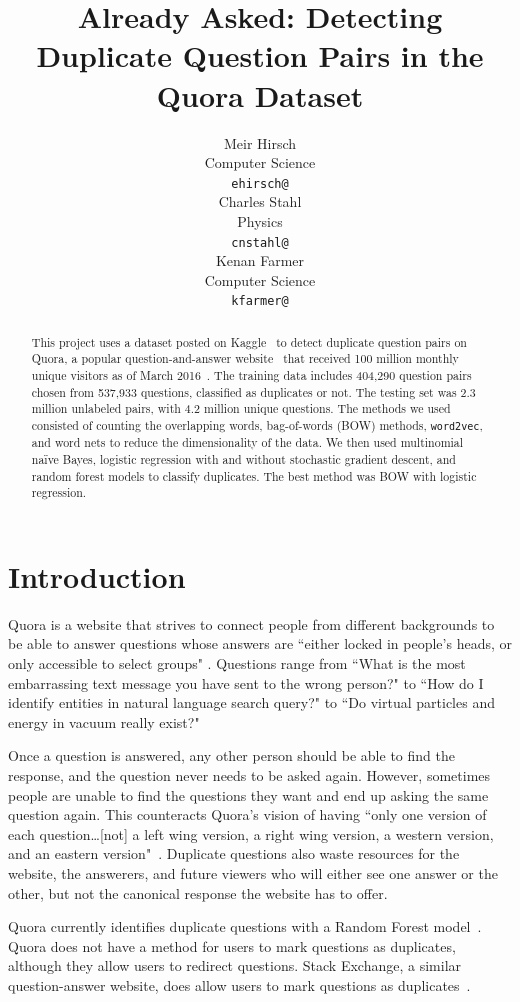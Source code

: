 \documentclass{article} %
\title{Already Asked: Detecting Duplicate Question Pairs in the Quora Dataset}
\author{
Meir Hirsch \\
Computer Science\\
\texttt{ehirsch@} \\
\And
Charles Stahl \\
Physics \\
\texttt{cnstahl@} \\
\And
Kenan Farmer\\
Computer Science \\
\texttt{kfarmer@}\\
}
\newcommand{\wordtvec}{\texttt{word2vec}}
\begin{document}
\maketitle

\begin{abstract}
This project uses a dataset posted on Kaggle~\cite{kaggleComp} to detect duplicate question pairs on Quora, a popular question-and-answer website~\cite{quora} that received 100 million monthly unique visitors as of March 2016~\cite{qvisit}. The training data includes 404,290 question pairs chosen from 537,933 questions, classified as duplicates or not. The testing set was 2.3 million unlabeled pairs, with 4.2 million unique questions. The methods we used consisted of counting the overlapping words, bag-of-words (BOW) methods, \wordtvec, and word nets to reduce the dimensionality of the data. We then used multinomial na\"ive Bayes, logistic regression with and without stochastic gradient descent, and random forest models to classify duplicates. The best method was BOW with logistic regression.
\end{abstract}

\section{Introduction}

Quora is a website that strives to connect people from different backgrounds to be able to answer questions whose answers are ``either locked in people’s heads, or only accessible to select groups" \cite{quora}. Questions range from ``What is the most embarrassing text message you have sent to the wrong person?" to ``How do I identify entities in natural language search query?" to ``Do virtual particles and energy in vacuum really exist?"

Once a question is answered, any other person should be able to find the response, and the question never needs to be asked again. However, sometimes people are unable to find the questions they want and end up asking the same question again. This counteracts Quora's vision of having ``only one version of each question\dots [not] a left wing version, a right wing version, a western version, and an eastern version"~\cite{quora}. Duplicate questions also waste resources for the website, the answerers, and future viewers who will either see one answer or the other, but not the canonical response the website has to offer.

Quora currently identifies duplicate questions with a Random Forest model~\cite{kaggleComp}. Quora does not have a method for users to mark questions as duplicates, although they allow users to redirect questions. Stack Exchange, a similar question-answer website, does allow users to mark questions as duplicates~\cite{stackdup}. 
\end{document}
